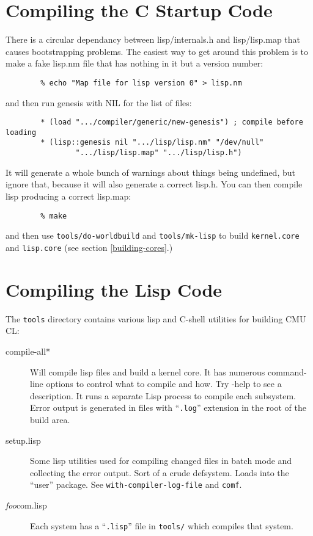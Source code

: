 \section{Compiling the C Startup Code}

There is a circular dependancy between lisp/internals.h and lisp/lisp.map that
causes bootstrapping problems.  The easiest way to get around this problem
is to make a fake lisp.nm file that has nothing in it but a version number:

\begin{verbatim}
        % echo "Map file for lisp version 0" > lisp.nm
\end{verbatim}
and then run genesis with NIL for the list of files:
\begin{verbatim}
        * (load ".../compiler/generic/new-genesis") ; compile before loading
        * (lisp::genesis nil ".../lisp/lisp.nm" "/dev/null"
                ".../lisp/lisp.map" ".../lisp/lisp.h")
\end{verbatim}
It will generate
a whole bunch of warnings about things being undefined, but ignore
that, because it will also generate a correct lisp.h.  You can then
compile lisp producing a correct lisp.map:
\begin{verbatim}
        % make
\end{verbatim}
and then use \verb|tools/do-worldbuild| and \verb|tools/mk-lisp| to build
\verb|kernel.core| and \verb|lisp.core| (see section \ref{building-cores}.)

\section{Compiling the Lisp Code}

The \verb|tools| directory contains various lisp and C-shell utilities for
building CMU CL:
\begin{description}
\item[compile-all*] Will compile lisp files and build a kernel core.  It has
numerous command-line options to control what to compile and how.  Try -help to
see a description.  It runs a separate Lisp process to compile each
subsystem.  Error output is generated in files with ``{\tt .log}'' extension in
the root of the build area.

\item[setup.lisp] Some lisp utilities used for compiling changed files in batch
mode and collecting the error output. Sort of a crude defsystem.  Loads into the
``user'' package.  See {\tt with-compiler-log-file} and {\tt comf}.

\item[{\it foo}com.lisp] Each system has a ``\verb|.lisp|'' file in
\verb|tools/| which compiles that system.
\end{description}

